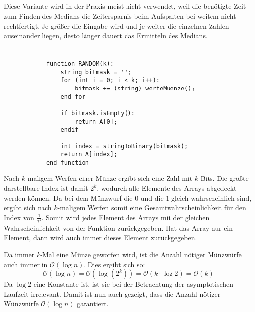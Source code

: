 \documentclass[10pt,a4paper,oneside,ngerman,numbers=noenddot]{scrartcl}
\begin{document}
	\subsection{} %
		Diese Variante wird in der Praxis meist nicht verwendet, weil die benötigte Zeit zum Finden des Medians die Zeitersparnis beim Aufspalten bei weitem nicht rechtfertigt. Je größer die Eingabe wird und je weiter die einzelnen Zahlen auseinander liegen, desto länger dauert das Ermitteln des Medians.
	\subsection{} %
\section{} %
	\subsection{} %
		\begin{verbatim}
			function RANDOM(k):
			    string bitmask = '';
			    for (int i = 0; i < k; i++):
			        bitmask += (string) werfeMuenze();
			    end for
			    
			    if bitmask.isEmpty():
			        return A[0];
			    endif
			    
			    int index = stringToBinary(bitmask);
			    return A[index];
			end function
		\end{verbatim}
		Nach $k$-maligem Werfen einer Münze ergibt sich eine Zahl mit $k$ Bits. Die größte darstellbare Index ist damit $2^{k}$, wodurch alle Elemente des Arrays abgedeckt werden können. Da bei dem Münzwurf die $0$ und die $1$ gleich wahrscheinlich sind, ergibt sich nach $k$-maligem Werfen somit eine Gesamtwahrscheinlichkeit für den Index von $\frac{1}{2^{k}}$. Somit wird jedes Element des Arrays mit der gleichen Wahrscheinlichkeit von der Funktion zurückgegeben. Hat das Array nur ein Element, dann wird auch immer dieses Element zurückgegeben.
		
		Da immer $k$-Mal eine Münze geworfen wird, ist die Anzahl nötiger Münzwürfe auch immer in $\mathcal{O}(\log n)$. Dies ergibt sich so:
		\[
			\mathcal{O}(\log n) = \mathcal{O}(\log(2^{k})) = \mathcal{O}(k \cdot \log 2) = \mathcal{O}(k)
		\]
		Da $\log 2$ eine Konstante ist, ist sie bei der Betrachtung der asymptotischen Laufzeit irrelevant. Damit ist nun auch gezeigt, dass die Anzahl nötiger Wünzwürfe $\mathcal{O}(\log n)$ garantiert.
\end{document}
